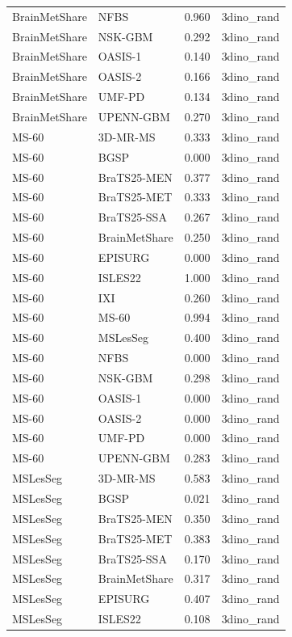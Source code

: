 \begin{tabular}{llrl}
BrainMetShare & NFBS & 0.960 & 3dino\_rand \\
BrainMetShare & NSK-GBM & 0.292 & 3dino\_rand \\
BrainMetShare & OASIS-1 & 0.140 & 3dino\_rand \\
BrainMetShare & OASIS-2 & 0.166 & 3dino\_rand \\
BrainMetShare & UMF-PD & 0.134 & 3dino\_rand \\
BrainMetShare & UPENN-GBM & 0.270 & 3dino\_rand \\
MS-60 & 3D-MR-MS & 0.333 & 3dino\_rand \\
MS-60 & BGSP & 0.000 & 3dino\_rand \\
MS-60 & BraTS25-MEN & 0.377 & 3dino\_rand \\
MS-60 & BraTS25-MET & 0.333 & 3dino\_rand \\
MS-60 & BraTS25-SSA & 0.267 & 3dino\_rand \\
MS-60 & BrainMetShare & 0.250 & 3dino\_rand \\
MS-60 & EPISURG & 0.000 & 3dino\_rand \\
MS-60 & ISLES22 & 1.000 & 3dino\_rand \\
MS-60 & IXI & 0.260 & 3dino\_rand \\
MS-60 & MS-60 & 0.994 & 3dino\_rand \\
MS-60 & MSLesSeg & 0.400 & 3dino\_rand \\
MS-60 & NFBS & 0.000 & 3dino\_rand \\
MS-60 & NSK-GBM & 0.298 & 3dino\_rand \\
MS-60 & OASIS-1 & 0.000 & 3dino\_rand \\
MS-60 & OASIS-2 & 0.000 & 3dino\_rand \\
MS-60 & UMF-PD & 0.000 & 3dino\_rand \\
MS-60 & UPENN-GBM & 0.283 & 3dino\_rand \\
MSLesSeg & 3D-MR-MS & 0.583 & 3dino\_rand \\
MSLesSeg & BGSP & 0.021 & 3dino\_rand \\
MSLesSeg & BraTS25-MEN & 0.350 & 3dino\_rand \\
MSLesSeg & BraTS25-MET & 0.383 & 3dino\_rand \\
MSLesSeg & BraTS25-SSA & 0.170 & 3dino\_rand \\
MSLesSeg & BrainMetShare & 0.317 & 3dino\_rand \\
MSLesSeg & EPISURG & 0.407 & 3dino\_rand \\
MSLesSeg & ISLES22 & 0.108 & 3dino\_rand \\

\end{tabular}
